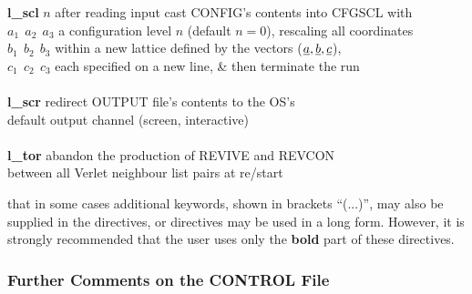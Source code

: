 \begin{tabbing}
\> {\bf l\_scl} \phantom{xxx} $n$               \> after reading input cast CONFIG's contents into CFGSCL with \\
\> \phantom{xxxxxxxx} $a_{1}~~a_{2}~~a_{3}$     \> a configuration level $n$ (default $n=0$), rescaling all coordinates \\
\> \phantom{xxxxxxxx} $b_{1}~~b_{2}~~b_{3}$     \> within a new lattice defined by the vectors ($\mbox{$\underline{a}$},\mbox{$\underline{b}$},\mbox{$\underline{c}$}$), \\
\> \phantom{xxxxxxxx} $c_{1}~~c_{2}~~c_{3}$     \> each specified on a new line, \& then terminate the run \\
\>                                              \> \\
\> {\bf l\_scr}                                 \> redirect OUTPUT file's contents to the OS's \\
\>                                              \> default output channel (screen, interactive) \\
\>                                              \> \\
\> {\bf l\_tor}                                 \> abandon the production of REVIVE and REVCON \\
\>                                              \> between all Verlet neighbour list pairs at re/start
\end{tabbing}

 that in some cases additional keywords, shown in
brackets ``(...)'', may also be supplied in the directives, or
directives may be used in a long form.  However, it is strongly
recommended that the user uses only the {\bf bold} part of these
directives.

\begin{table}[htbp]
\end{table}

\subsubsection{Further Comments on the CONTROL File}

